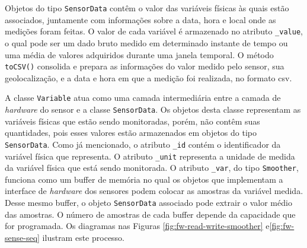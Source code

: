 Objetos do tipo \texttt{SensorData} contêm o valor das variáveis físicas às quais estão associados, juntamente com informações sobre a data, hora e local onde as medições foram feitas. O valor de cada variável é armazenado no atributo \texttt{\_value}, o qual pode ser um dado bruto medido em determinado instante de tempo ou uma média de valores adquiridos durante uma janela temporal. O método \texttt{toCSV()} consolida e prepara as informações do valor medido pelo sensor, sua geolocalização, e a data e hora em que a medição foi realizada, no formato \acrshort{csv}.

A classe \texttt{Variable} atua como uma camada intermediária entre a camada de \textit{hardware} do sensor e a classe \texttt{SensorData}. Os objetos desta classe representam as variáveis físicas que estão sendo monitoradas, porém, não contêm suas quantidades, pois esses valores estão armazenados em objetos do tipo \texttt{SensorData}. Como já mencionado, o atributo \texttt{\_id} contém o identificador da variável física que representa. O atributo \texttt{\_unit} representa a unidade de medida da variável física que está sendo monitorada. O atributo \texttt{\_var}, do tipo \texttt{Smoother}, funciona como um buffer de memória no qual os objetos que implementam a interface de \textit{hardware} dos sensores podem colocar as amostras da variável medida. Desse mesmo buffer, o objeto \texttt{SensorData} associado pode extrair o valor médio das amostras. O número de amostras de cada buffer depende da capacidade que for programada. Os diagramas nas Figuras \ref{fig:fw-read-write-smoother} e\ref{fig:fw-sense-seq} ilustram este processo.

